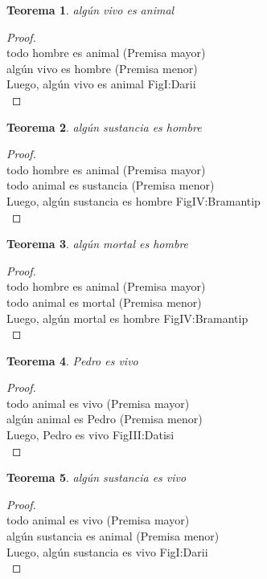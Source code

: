 ﻿\documentclass[12pt]{book}
\newtheorem{theorem}{Teorema}[chapter]
\newtheorem{proof}{Demostración}
\begin{document}
\begin{theorem}
algún vivo es animal
\label{th: 37}
\end{theorem}\begin{proof}\\todo hombre es animal	 (Premisa mayor) \\algún vivo es hombre	 (Premisa menor) \\Luego, algún vivo es animal	FigI:Darii \\ \end{proof}
\begin{theorem}
algún sustancia es hombre
\label{th: 38}
\end{theorem}\begin{proof}\\todo hombre es animal	 (Premisa mayor) \\todo animal es sustancia	 (Premisa menor) \\Luego, algún sustancia es hombre	FigIV:Bramantip \\ \end{proof}
\begin{theorem}
algún mortal es hombre
\label{th: 39}
\end{theorem}\begin{proof}\\todo hombre es animal	 (Premisa mayor) \\todo animal es mortal	 (Premisa menor) \\Luego, algún mortal es hombre	FigIV:Bramantip \\ \end{proof}
\begin{theorem}
Pedro es vivo
\label{th: 40}
\end{theorem}\begin{proof}\\todo animal es vivo	 (Premisa mayor) \\algún animal es Pedro	 (Premisa menor) \\Luego, Pedro es vivo	FigIII:Datisi \\ \end{proof}
\begin{theorem}
algún sustancia es vivo
\label{th: 41}
\end{theorem}\begin{proof}\\todo animal es vivo	 (Premisa mayor) \\algún sustancia es animal	 (Premisa menor) \\Luego, algún sustancia es vivo	FigI:Darii \\ \end{proof}
\end{document}
